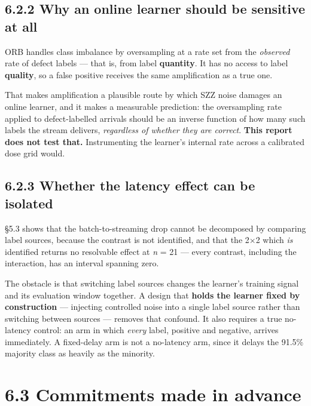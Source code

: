 \subsection{6.2.2 Why an online learner should be sensitive at
all}\label{why-an-online-learner-should-be-sensitive-at-all}

ORB handles class imbalance by oversampling at a rate set from the
\emph{observed} rate of defect labels --- that is, from label
\textbf{quantity}. It has no access to label \textbf{quality}, so a
false positive receives the same amplification as a true one.

That makes amplification a plausible route by which SZZ noise damages an
online learner, and it makes a measurable prediction: the oversampling
rate applied to defect-labelled arrivals should be an inverse function
of how many such labels the stream delivers, \emph{regardless of whether
they are correct}. \textbf{This report does not test that.}
Instrumenting the learner's internal rate across a calibrated dose grid
would.

\subsection{6.2.3 Whether the latency effect can be
isolated}\label{whether-the-latency-effect-can-be-isolated}

\S{}5.3 shows that the batch-to-streaming drop cannot be decomposed by
comparing label sources, because the contrast is not identified, and
that the 2\ensuremath{\times}2 which \emph{is} identified returns no resolvable effect at
\emph{n} = 21 --- every contrast, including the interaction, has an
interval spanning zero.

The obstacle is that switching label sources changes the learner's
training signal and its evaluation window together. A design that
\textbf{holds the learner fixed by construction} --- injecting
controlled noise into a single label source rather than switching
between sources --- removes that confound. It also requires a true
no-latency control: an arm in which \emph{every} label, positive and
negative, arrives immediately. A fixed-delay arm is not a no-latency
arm, since it delays the 91.5\% majority class as heavily as the
minority.

\section{6.3 Commitments made in
advance}\label{commitments-made-in-advance}

